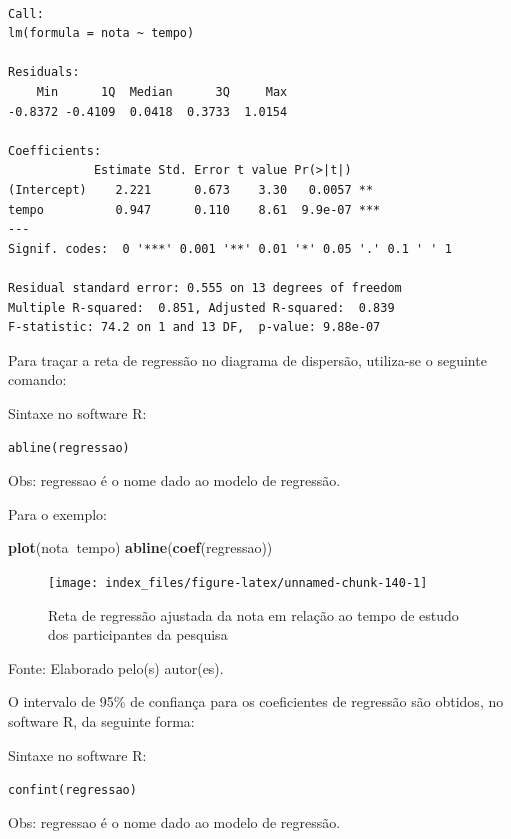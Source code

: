\documentclass[12pt,brazil,oneside]{book}
\newenvironment{Shaded}{\begin{snugshade}}{\end{snugshade}}
\newcommand{\KeywordTok}[1]{\textcolor[rgb]{0.13,0.29,0.53}{\textbf{#1}}}
\newcommand{\NormalTok}[1]{#1}
\newcommand{\OperatorTok}[1]{\textcolor[rgb]{0.81,0.36,0.00}{\textbf{#1}}}
\begin{document}
\begin{verbatim}

Call:
lm(formula = nota ~ tempo)

Residuals:
    Min      1Q  Median      3Q     Max 
-0.8372 -0.4109  0.0418  0.3733  1.0154 

Coefficients:
            Estimate Std. Error t value Pr(>|t|)    
(Intercept)    2.221      0.673    3.30   0.0057 ** 
tempo          0.947      0.110    8.61  9.9e-07 ***
---
Signif. codes:  0 '***' 0.001 '**' 0.01 '*' 0.05 '.' 0.1 ' ' 1

Residual standard error: 0.555 on 13 degrees of freedom
Multiple R-squared:  0.851, Adjusted R-squared:  0.839 
F-statistic: 74.2 on 1 and 13 DF,  p-value: 9.88e-07
\end{verbatim}

Para traçar a reta de regressão no diagrama de dispersão, utiliza-se o seguinte comando:

Sintaxe no software R:

\texttt{abline(regressao)}

Obs: regressao é o nome dado ao modelo de regressão.

Para o exemplo:

\begin{Shaded}
\begin{Highlighting}[]
\KeywordTok{plot}\NormalTok{(nota}\OperatorTok{~}\NormalTok{tempo)}
\KeywordTok{abline}\NormalTok{(}\KeywordTok{coef}\NormalTok{(regressao))}
\end{Highlighting}
\end{Shaded}

\begin{figure}[H]

{\centering \texttt{[image: index\_files/figure-latex/unnamed-chunk-140-1]} 

}

\caption{Reta de regressão ajustada da nota em relação ao tempo de estudo dos participantes da pesquisa}\label{fig:unnamed-chunk-140}
\end{figure}

Fonte: Elaborado pelo(s) autor(es).

O intervalo de 95\% de confiança para os coeficientes de regressão são obtidos, no software R, da seguinte forma:

Sintaxe no software R:

\texttt{confint(regressao)}

Obs: regressao é o nome dado ao modelo de regressão.
\end{document}
